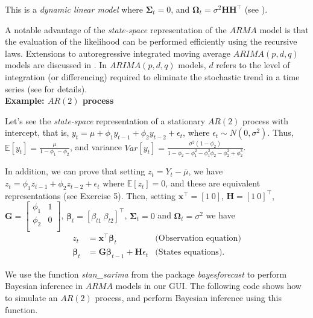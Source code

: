 This is a \textit{dynamic linear model} where $\bm{\Sigma}_t=0$, and $\bm{\Omega}_t=\sigma^2\bm{H}\bm{H}^{\top}$ (see \cite{petris2009dynamic,chib1994bayes}).

A notable advantage of the \textit{state-space} representation of the $ARMA$ model is that the evaluation of the likelihood can be performed efficiently using the recursive laws. Extensions to autoregressive integrated moving average $ARIMA(p,d,q)$ models are discussed in \cite[Chap.~3]{petris2009dynamic}. In $ARIMA(p,d,q)$ models, $d$ refers to the level of integration (or differencing) required to eliminate the stochastic trend in a time series (see \cite[Chap.~4]{enders_2014} for details).\\

\textbf{Example: $AR(2)$ process}

Let's see the \textit{state-space} representation of a stationary $AR(2)$ process with intercept, that is, $y_t=\mu+\phi_1y_{t-1}+\phi_2y_{t-2}+\epsilon_t$, where $\epsilon_t\sim N(0,\sigma^2)$. Thus, $\mathbb{E}[y_t]=\frac{\mu}{1-\phi_1-\phi_2}$, and variance $Var[y_t]=\frac{\sigma^2(1-\phi_2)}{1-\phi_2-\phi_1^2-\phi_1^2\phi_2-\phi_2^2+\phi_2^3}$.

In addition, we can prove that setting $z_t=Y_t-\bar{\mu}$, we have $z_t=\phi_1z_{t-1}+\phi_2z_{t-2}+\epsilon_t$ where $\mathbb{E}[z_t]=0$, and these are equivalent representations (see Exercise 5). Then, setting  $\bm{x}^{\top}=[1 \ 0]$, $\bm{H}=[1 \ 0]^{\top}$, $\bm{G}=\begin{bmatrix}
	\phi_1 & 1\\
	\phi_2 & 0 \\
\end{bmatrix}$, $\bm{\beta}_t=[\beta_{t1} \ \beta_{t2}]^{\top}$, $\bm{\Sigma}_t=0$ and $\bm{\Omega}_t=\sigma^2$ we have
\begin{align*}
	z_t&=\bm{x}^{\top}\bm{\beta}_t& \text{(Observation equation)}\\
	\bm{\beta}_t&=\bm{G}\bm{\beta}_{t-1}+\bm{H}{\epsilon}_t & \text{(States equations)}.
\end{align*}

We use the function \textit{stan\_sarima} from the package \textit{bayesforecast} to perform Bayesian inference in $ARMA$ models in our GUI. The following code shows how to simulate an $AR(2)$ process, and perform Bayesian inference using this function.

